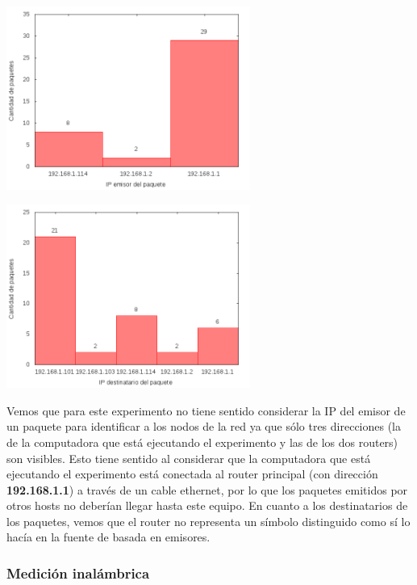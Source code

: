 \begin{minipage}{8cm}
  \centering
  \includegraphics[width=8cm]{../mediciones/home-eth-10/home-eth-10IpsSrcArp.png}
\end{minipage}%
\begin{minipage}{8cm}
  \centering
  \includegraphics[width=8cm]{../mediciones/home-eth-10/home-eth-10IpsDstArp.png}
\end{minipage}

Vemos que para este experimento no tiene sentido considerar la IP del emisor de un paquete para identificar a los nodos de la red ya que sólo tres direcciones
(la de la computadora que está ejecutando el experimento y las de los dos routers) son visibles. Esto tiene sentido al considerar que la computadora que
está ejecutando el experimento está conectada al router principal (con dirección \textbf{192.168.1.1}) a través de un cable ethernet, por lo que los paquetes emitidos
por otros hosts no deberían llegar hasta este equipo. En cuanto a los destinatarios de los paquetes, vemos que el router no representa un símbolo distinguido
como sí lo hacía en la fuente de basada en emisores.

\subsubsection{Medición inalámbrica}

